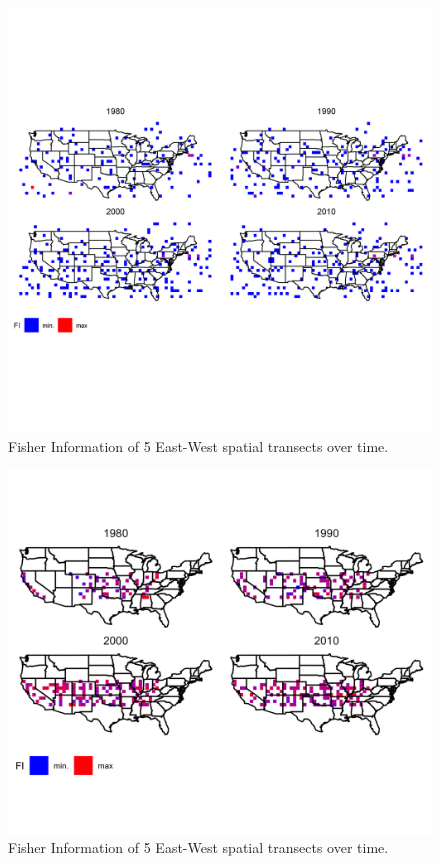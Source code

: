\documentclass[12pt,twoside,openany]{reedthesis}
\begin{document}
\begin{figure}
\includegraphics[width=0.85\linewidth]{./chapterFiles/fisherSpatial/figures/figsCalledInDiss/usaAllTsects_East-West_metric_FI} \caption{Fisher Information of 5 East-West spatial transects over time.}\label{fig:usaFI}
\end{figure}
\begin{figure}
\includegraphics[width=0.85\linewidth]{./chapterFiles/fisherSpatial/figures/figsCalledInDiss/usaAllTsects_East-West_metric_logScaleFI} \caption{Fisher Information of 5 East-West spatial transects over time.}\label{fig:usaFI}
\end{figure}
\end{document}
